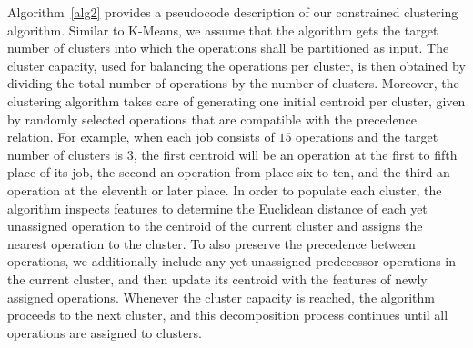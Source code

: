 \documentclass[runningheads]{llncs}
\begin{document}
%
Algorithm~\ref{alg2} provides a pseudocode description of our constrained clustering algorithm.
Similar to K-Means, we assume that the algorithm gets the target number of clusters 
into which the operations shall be partitioned as input.
The cluster capacity, used for balancing the operations per cluster, is then obtained by dividing the total number of operations by the number of clusters.
Moreover, the clustering algorithm takes care of generating one initial centroid per cluster, given by randomly selected operations that are compatible with the precedence relation.
For example, when each job consists of $15$ operations and the target number of clusters is $3$,
the first centroid will be an operation at the first to fifth place of its job,
the second an operation from place six to ten, and the third an operation at the eleventh
or later place.
%
In order to populate each cluster, the algorithm inspects features to determine the Euclidean distance of each yet unassigned operation to the centroid of the current cluster and assigns the nearest operation to the cluster. To also preserve the precedence between operations, we additionally include any yet unassigned predecessor operations in the current cluster, and then update its centroid with the features of newly assigned operations. Whenever the cluster capacity is reached, the algorithm proceeds to the next cluster, and this decomposition process continues until all operations are assigned to clusters.
%

\end{document}
